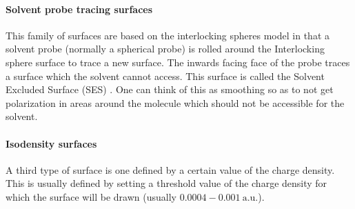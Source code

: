 \documentclass[../master_thesis.tex]{subfiles}
\begin{document}
\paragraph{Solvent probe tracing surfaces}\label{Spts}
This family of surfaces are based on the interlocking spheres model in that a
solvent probe (normally a spherical probe) is rolled around the Interlocking
sphere surface to trace a new surface. The inwards facing face of the probe traces a surface
which the solvent cannot access. This surface is called the Solvent Excluded
Surface (SES) \cite{Tomasi:2005ipa, Mennucci:2018}.  One can think of this as
smoothing so as to not get polarization in areas around the molecule which should
not be accessible for the solvent.

\paragraph{Isodensity surfaces}
A third type of surface is one defined by a certain value of the charge density.
This is usually defined by setting a threshold value of the charge density for
which the surface will be drawn (usually $0.0004-0.001\ \text{a.u.}$)\cite{Tomasi:2005ipa}.
\end{document}

